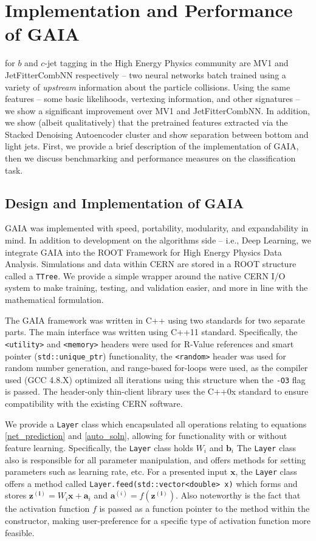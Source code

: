 \chapter{Implementation and Performance of GAIA}
 for $b$ and $c$-jet tagging in the High Energy Physics community are MV1 and JetFitterCombNN respectively -- two neural networks batch trained using a variety of \emph{upstream} information about the particle collisions. Using the same features -- some basic likelihoods, vertexing information, and other signatures -- we show a significant improvement over MV1 and JetFitterCombNN. In addition, we show (albeit qualitatively) that the pretrained features extracted via the Stacked Denoising Autoencoder cluster and show separation between bottom and light jets. First, we provide a brief description of the implementation of GAIA, then we discuss benchmarking and performance measures on the classification task.

\section{Design and Implementation of GAIA}
GAIA was implemented with speed, portability, modularity, and expandability in mind. In addition to development on the algorithms side -- i.e., Deep Learning, we integrate GAIA into the ROOT \citep{ROOT} Framework for High Energy Physics Data Analysis. Simulations and data within CERN are stored in a ROOT structure called a \texttt{TTree}. We provide a simple wrapper around the native CERN I/O system to make training, testing, and validation easier, and more in line with the mathematical formulation.

The GAIA framework was written in C++ using two standards for two separate parts. The main interface was written using C++11 standard. Specifically, the \texttt{<utility>} and \texttt{<memory>} headers were used for R-Value references and smart pointer (\texttt{std::unique\_{}ptr}) functionality, the \texttt{<random>} header was used for random number generation, and range-based for-loops were used, as the compiler used (GCC 4.8.X) optimized all iterations using this structure when the \texttt{-O3} flag is passed. The header-only thin-client library uses the C++0x standard to ensure compatibility with the existing CERN software.

We provide a \texttt{Layer} class which encapsulated all operations relating to equations \eqref{net_prediction} and \eqref{auto_soln}, allowing for functionality with or without feature learning. Specifically, the \texttt{Layer} class holds $W_i$ and $\mathbf{b}_i$ The \texttt{Layer} class also is responsible for all parameter manipulation, and offers methods for setting parameters such as learning rate, etc. For a presented input $\mathbf{x}$, the \texttt{Layer} class offers a method called \texttt{Layer.feed(std::vector<double> x)} which forms and stores $\mathbf{z^{(i)}} = W_i \mathbf{x}+\mathbf{a}_i$ and $\mathbf{a}^{(i)}=f(\mathbf{z^{(i)}})$. Also noteworthy is the fact that the activation function $f$ is passed as a function pointer to the method within the constructor, making user-preference for a specific type of activation function more feasible.

